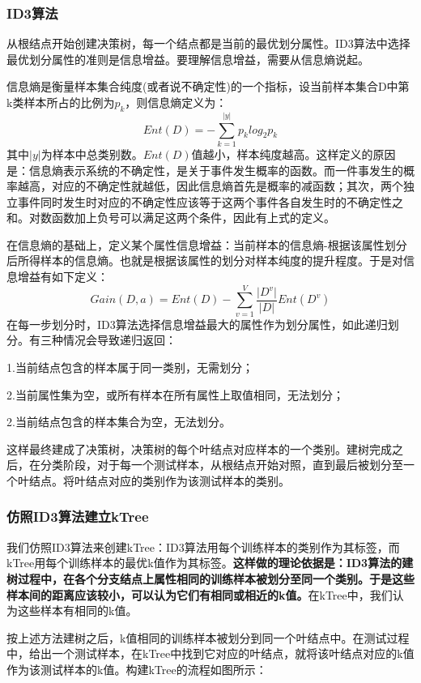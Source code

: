 \documentclass{ctexart}
\begin{document}
	\subsubsection{ID3算法}
	从根结点开始创建决策树，每一个结点都是当前的最优划分属性。ID3算法中选择最优划分属性的准则是信息增益。要理解信息增益，需要从信息熵说起。
	
	信息熵是衡量样本集合纯度(或者说不确定性)的一个指标，设当前样本集合D中第k类样本所占的比例为$ p_k $，则信息熵定义为：
	\begin{equation}
	Ent(D) = -\sum_{k=1}^{\vert y \vert}p_{k}log_{2}p_k
	\end{equation}
	其中$ \vert y \vert $为样本中总类别数。$ Ent(D) $值越小，样本纯度越高。这样定义的原因是：信息熵表示系统的不确定性，是关于事件发生概率的函数。而一件事发生的概率越高，对应的不确定性就越低，因此信息熵首先是概率的减函数；其次，两个独立事件同时发生时对应的不确定性应该等于这两个事件各自发生时的不确定性之和。对数函数加上负号可以满足这两个条件，因此有上式的定义。
	
	在信息熵的基础上，定义某个属性信息增益：当前样本的信息熵-根据该属性划分后所得样本的信息熵。也就是根据该属性的划分对样本纯度的提升程度。于是对信息增益有如下定义：
	\begin{equation}
	Gain(D,a) = Ent(D) - \sum_{v=1}^{V}\frac{\vert D^{v} \vert}{\vert D \vert}Ent(D^v)
	\end{equation}
	在每一步划分时，ID3算法选择信息增益最大的属性作为划分属性，如此递归划分。有三种情况会导致递归返回：
	
	1.当前结点包含的样本属于同一类别，无需划分；
	
	2.当前属性集为空，或所有样本在所有属性上取值相同，无法划分；
	
	2.当前结点包含的样本集合为空，无法划分。
	
	这样最终建成了决策树，决策树的每个叶结点对应样本的一个类别。建树完成之后，在分类阶段，对于每一个测试样本，从根结点开始对照，直到最后被划分至一个叶结点。将叶结点对应的类别作为该测试样本的类别。
	\subsubsection{仿照ID3算法建立kTree}
	我们仿照ID3算法来创建kTree：ID3算法用每个训练样本的类别作为其标签，而kTree用每个训练样本的最优k值作为其标签。{\bfseries 这样做的理论依据是：ID3算法的建树过程中，在各个分支结点上属性相同的训练样本被划分至同一个类别。于是这些样本间的距离应该较小，可以认为它们有相同或相近的k值。}在kTree中，我们认为这些样本有相同的k值。
	
	按上述方法建树之后，k值相同的训练样本被划分到同一个叶结点中。在测试过程中，给出一个测试样本，在kTree中找到它对应的叶结点，就将该叶结点对应的k值作为该测试样本的k值。构建kTree的流程如图所示：
	
\end{document}
